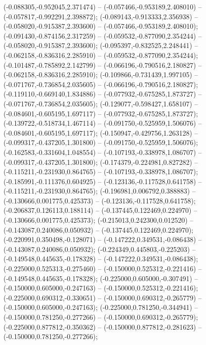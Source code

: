  (-0.088305,-0.952045,2.371474) -- (-0.057466,-0.953189,2.408010) -- (-0.057817,-0.992291,2.398872);
 (-0.089143,-0.913333,2.356938) -- (-0.058020,-0.915387,2.393600) -- (-0.057466,-0.953189,2.408010);
 (-0.091430,-0.874156,2.317259) -- (-0.059532,-0.877090,2.354244) -- (-0.058020,-0.915387,2.393600);
 (-0.095397,-0.832525,2.248441) -- (-0.062158,-0.836316,2.285910) -- (-0.059532,-0.877090,2.354244);
 (-0.101487,-0.785892,2.142799) -- (-0.066196,-0.790516,2.180827) -- (-0.062158,-0.836316,2.285910);
 (-0.109866,-0.731439,1.997105) -- (-0.071767,-0.736854,2.035605) -- (-0.066196,-0.790516,2.180827);
 (-0.119110,-0.669140,1.834886) -- (-0.077932,-0.675285,1.873727) -- (-0.071767,-0.736854,2.035605);
 (-0.129077,-0.598427,1.658107) -- (-0.084601,-0.605195,1.697117) -- (-0.077932,-0.675285,1.873727);
 (-0.139722,-0.518734,1.467114) -- (-0.091750,-0.525959,1.506076) -- (-0.084601,-0.605195,1.697117);
 (-0.150947,-0.429756,1.263128) -- (-0.099317,-0.437205,1.301800) -- (-0.091750,-0.525959,1.506076);
 (-0.162583,-0.331604,1.048554) -- (-0.107193,-0.338978,1.086707) -- (-0.099317,-0.437205,1.301800);
 (-0.174379,-0.224981,0.827282) -- (-0.115211,-0.231930,0.864765) -- (-0.107193,-0.338978,1.086707);
 (-0.185991,-0.111376,0.604925) -- (-0.123136,-0.117528,0.641758) -- (-0.115211,-0.231930,0.864765);
 (-0.196981,0.006792,0.388883) -- (-0.130666,0.001775,0.425373) -- (-0.123136,-0.117528,0.641758);
 (-0.206837,0.126113,0.188114) -- (-0.137445,0.122469,0.224970) -- (-0.130666,0.001775,0.425373);
 (-0.215013,0.242300,0.012520) -- (-0.143087,0.240086,0.050932) -- (-0.137445,0.122469,0.224970);
 (-0.220991,0.350498,-0.128071) -- (-0.147222,0.349531,-0.086438) -- (-0.143087,0.240086,0.050932);
 (-0.224349,0.445803,-0.225203) -- (-0.149548,0.445635,-0.178328) -- (-0.147222,0.349531,-0.086438);
 (-0.225000,0.525313,-0.275460) -- (-0.150000,0.525312,-0.221416) -- (-0.149548,0.445635,-0.178328);
 (-0.225000,0.605000,-0.307491) -- (-0.150000,0.605000,-0.247163) -- (-0.150000,0.525312,-0.221416);
 (-0.225000,0.690312,-0.330651) -- (-0.150000,0.690312,-0.265779) -- (-0.150000,0.605000,-0.247163);
 (-0.225000,0.781250,-0.344941) -- (-0.150000,0.781250,-0.277266) -- (-0.150000,0.690312,-0.265779);
 (-0.225000,0.877812,-0.350362) -- (-0.150000,0.877812,-0.281623) -- (-0.150000,0.781250,-0.277266);
